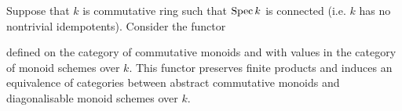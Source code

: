 \begin{theorem}\label{theorem:commutative_monoids_and_diagonalisable_monoid_k_schemes}
Suppose that $k$ is commutative ring such that $\mathrm{Spec}\, k$ is connected (i.e. $k$ has no nontrivial idempotents). Consider the functor 
\begin{center}
\end{center}
defined on the category of commutative monoids and with values in the category of monoid schemes over $k$. This functor preserves finite products and induces an equivalence of categories between abstract commutative monoids and diagonalisable monoid schemes over $k$.
\end{theorem}
